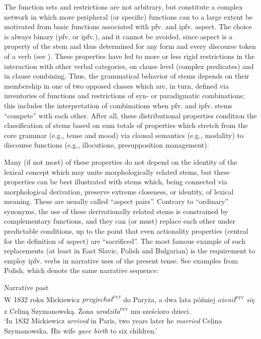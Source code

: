 \documentclass[output=paper]{langscibook}
\begin{document}
The function sets and restrictions are not arbitrary, but constitute a complex network in which more peripheral (or specific) functions can to a large extent be motivated from basic functions associated with pfv. and ipfv. aspect. The choice is always binary (pfv. or ipfv.), and it cannot be avoided, since aspect is a property of the stem and thus determined for any form and every discourse token of a verb (see ). These properties have led to more or less rigid restrictions in the interaction with other verbal categories, on clause level (complex predicates) and in clause combining. Thus, the grammatical behavior of stems depends on their membership in one of two opposed classes which are, in turn, defined via inventories of functions and restrictions of syn- or paradigmatic combinations; this includes the interpretation of combinations when pfv. and ipfv. stems “compete” with each other. After all, these distributional properties condition the classification of stems based on sum totals of properties which stretch from the core grammar (e.g., tense and mood) via clausal semantics (e.g., modality) to discourse functions (e.g., illocutions, presupposition management).

Many (if not most) of these properties do not depend on the identity of the lexical concept which may unite morphologically related stems, but these properties can be best illustrated with stems which, being connected via morphological derivation, preserve extreme closeness, or identity, of lexical meaning. These are usually called ``aspect pairs''. Contrary to “ordinary” synonyms, the use of these derivationally related stems is constrained by complementary functions, and they can (or must) replace each other under predictable conditions, up to the point that even actionality properties (central for the definition of aspect) are “sacrificed”. The most famous example of such replacements (at least in East Slavic, Polish and Bulgarian) is the requirement to employ ipfv. verbs in narrative uses of the present tense. See examples from Polish, which denote the same narrative sequence:

\ea 
\ea
{Narrative past}\\ 
W 1832 roku Mickiewicz \textit{przyjechał\textsuperscript{\textsc{pfv}}} do Paryża, a dwa lata później \textit{ożenił}\textsuperscript{\textsc{pfv}} \textit{się} z Celiną   Szymanowską. Żona \textit{urodziła}\textsuperscript{\textsc{pfv}} mu sześcioro dzieci.\\
    ‘In 1832 Mickiewicz \textit{arrived} in Paris, two years later he \textit{married} Celina Szymanowska. His wife \textit{gave birth} to six children.’\\ \label{ex:wiemer:8a}
\end{document}

